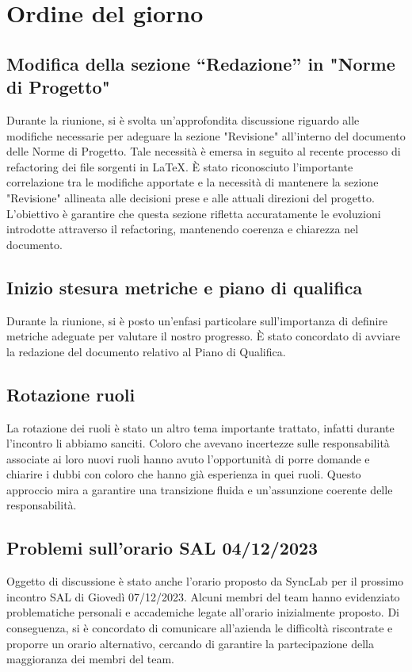 \documentclass{article}
\begin{document}
\section{Ordine del giorno}
    \subsection{Modifica della sezione “Redazione” in "Norme di Progetto"}
    Durante la riunione, si è svolta un'approfondita discussione riguardo alle modifiche necessarie per adeguare la sezione "Revisione" all'interno del documento delle Norme di Progetto. Tale necessità è emersa in seguito al recente processo di refactoring dei file sorgenti in \LaTeX. È stato riconosciuto l'importante correlazione tra le modifiche apportate e la necessità di mantenere la sezione "Revisione" allineata alle decisioni prese e alle attuali direzioni del progetto. L'obiettivo è garantire che questa sezione rifletta accuratamente le evoluzioni introdotte attraverso il refactoring, mantenendo coerenza e chiarezza nel documento.
    
    \subsection{Inizio stesura metriche e piano di qualifica}
    Durante la riunione, si è posto un'enfasi particolare sull'importanza di definire metriche adeguate per valutare il nostro progresso. È stato concordato di avviare la redazione del documento relativo al Piano di Qualifica.

    \subsection{Rotazione ruoli}
    La rotazione dei ruoli è stato un altro tema importante trattato, infatti durante l'incontro li abbiamo sanciti. Coloro che avevano incertezze sulle responsabilità associate ai loro nuovi ruoli hanno avuto l'opportunità di porre domande e chiarire i dubbi con coloro che hanno già esperienza in quei ruoli. Questo approccio mira a garantire una transizione fluida e un'assunzione coerente delle responsabilità.
    
    \subsection{Problemi sull'orario SAL 04/12/2023}
     Oggetto di discussione è stato anche l'orario proposto da SyncLab per il prossimo incontro SAL di Giovedì 07/12/2023. Alcuni membri del team hanno evidenziato problematiche personali e accademiche legate all'orario inizialmente proposto. Di conseguenza, si è concordato di comunicare all'azienda le difficoltà riscontrate e proporre un orario alternativo, cercando di garantire la partecipazione della maggioranza dei membri del team.
\end{document}
